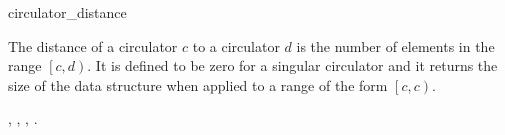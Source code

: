 
\begin{ccRefFunction}{circulator_distance}

\ccDefinition


The distance of a circulator $c$ to a circulator $d$ is the number of
elements in the range $\left[c, d\right)$. It is defined to be zero
for a singular circulator and it returns the size of the data
structure when applied to a range of the form $\left[c, c\right)$.



\ccSeeAlso

,
,
,
.

\end{ccRefFunction}

